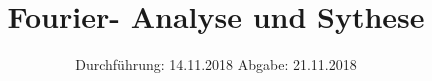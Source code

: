 

\subject{Versuch 351}
\title{Fourier- Analyse und Sythese}
\date{%
  Durchführung: 14.11.2018
  \hspace{3em}
  Abgabe: 21.11.2018
}



\maketitle
\thispagestyle{empty}
\tableofcontents
\newpage






\printbibliography{}


